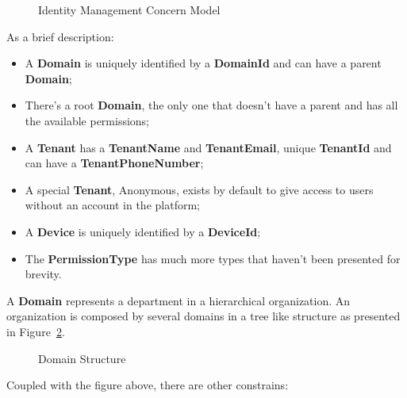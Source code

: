 \begin{figure}[H]
   \centering
  \resizebox{\columnwidth}{!}
  {
     
  }
  \caption[Identity Management Concern Model]{Identity Management Concern Model}
  \label{fig:design:domain:bounded_contexts:identity:diagram}
\end{figure}

As a brief description:

\begin{itemize}
   \item A \textbf{Domain} is uniquely identified by a \textbf{DomainId} and can have a parent \textbf{Domain};
   \item There's a root \textbf{Domain}, the only one that doesn't have a parent and has all the available permissions;
   \item A \textbf{Tenant} has a \textbf{TenantName} and \textbf{TenantEmail}, unique \textbf{TenantId} and can have a \textbf{TenantPhoneNumber};
   \item A special \textbf{Tenant}, Anonymous, exists by default to give access to users without an account in the platform;
   \item A \textbf{Device} is uniquely identified by a \textbf{DeviceId};
   \item The \textbf{PermissionType} has much more types that haven't been presented for brevity.
\end{itemize}

A \textbf{Domain} represents a department in a hierarchical organization. An organization is composed by several domains in a tree like structure as presented in Figure~\ref{fig:design:domain:bounded_contexts:identity:organization}.

\begin{figure}[H]
   \centering
  \resizebox{\columnwidth}{!}
  {
     
  }
  \caption[Domain Structure]{Domain Structure}
  \label{fig:design:domain:bounded_contexts:identity:organization}
\end{figure}

Coupled with the figure above, there are other constrains:

